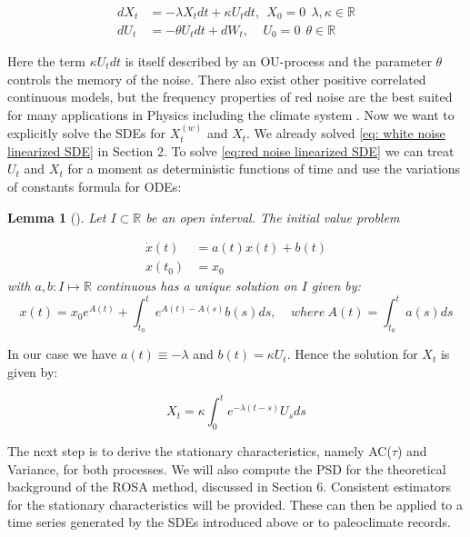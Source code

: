 \documentclass[%
thesis=student,%
coverpage=false,%
titlepage=false,%
headmarks=true, %
english,%
font=libertine, %
math=newpxtx, %
BCOR=5mm,%
coverBCOR=11mm%
]{tumbook}
\newtheorem{lemma}{Lemma}
\begin{document}
\begin{subequations}
    \begin{align}
        dX_{t} &= -\lambda X_{t}dt + \kappa U_{t}dt,\ \ X_{0} = 0 \label{eq: 3.2a} \ \ \lambda,\kappa \in \mathbb{R}  \\ 
        dU_{t} &= -\theta U_{t}dt + dW_{t}, \ \ \ \ \ U_{0} = 0 \label{eq: 3.2b} \ \ \theta \in \mathbb{R}
    \end{align}
    \label{eq:red noise linearized SDE}
\end{subequations}

Here the term $\kappa U_{t}dt$ is itself described by an OU-process and the parameter $\theta$ controls the memory of the noise. There also exist other positive correlated continuous models, but the frequency properties of red noise are the best suited for many applications in Physics including the climate system \cite{Hasselmann:1976, Hanggi:1993, Liao:2022}. 
Now we want to explicitly solve the SDEs for $X_{t}^{(w)}$ and $X_{t}$. We already solved \eqref{eq: white noise linearized SDE} in Section 2. To solve \eqref{eq:red noise linearized SDE} we can treat $U_{t}$ and $X_{t}$ for a moment as deterministic functions of time and use the variations of constants formula for ODEs: \\

\begin{lemma}[\cite{Kuttler:2023}]
    Let $I \subset \mathbb{R}$ be an open interval. The initial value problem
        
    \begin{subequations}
        \begin{align}
            \dot{x}(t) &= a(t)x(t) + b(t)  \\
            x(t_{0}) &= x_{0}
        \end{align}
    \end{subequations}
    with $a,b : I \mapsto \mathbb{R}$ continuous has a unique solution on $I$ given by:
    \[
    x(t) = x_{0}e^{A(t)} + \int_{t_{0}}^{t}e^{A(t)-A(s)}b(s)ds, \ \ \ \ \ where \ A(t) = \int_{t_{0}}^{t}a(s)ds
    \]
\end{lemma}
In our case we have $a(t) \equiv -\lambda$ and $b(t) = \kappa U_{t}$. Hence the solution for $X_{t}$ is given by:

\begin{equation}
    X_{t} = \kappa\int_{0}^{t}e^{-\lambda(t-s)}U_{s}ds
    \label{red noise solution}
\end{equation}

The next step is to derive the stationary characteristics, namely AC($\tau$) and Variance, for both processes. We will also compute the PSD for the theoretical background of the ROSA method, discussed in Section 6. Consistent estimators for the stationary characteristics will be provided. These can then be applied to a time series generated by the SDEs introduced above or to paleoclimate records. 
\end{document}
